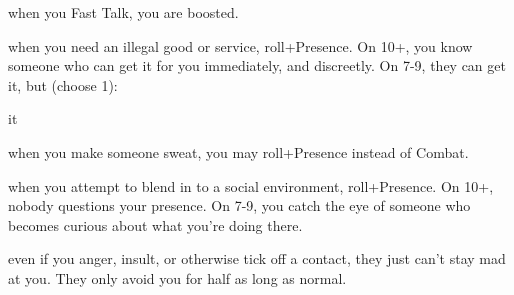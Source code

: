 \begin{dossier}
\begin{dossiermovebar}
\begin{moveoptions}

\end{moveoptions}

 when you
Fast Talk, you are boosted.

 when you need an illegal good or service, roll+Presence. On 10+, you
know someone who can get it for you immediately, and discreetly. On 7-9, they can get it,
but (choose 1):

\begin{moveoptions}


it
\end{moveoptions}

 when you make someone sweat, you may roll+Presence instead of
Combat.

 when you attempt to blend in to a social environment, roll+Presence. On
10+, nobody questions your presence. On 7-9, you catch the eye of someone who becomes
curious about what you’re doing there.

 even if you anger, insult, or otherwise tick off a contact, they just can’t stay
mad at you. They only avoid you for half as long as normal.

\end{dossiermovebar}%
\end{dossier}

